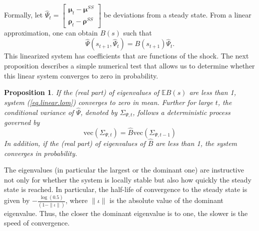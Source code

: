 \documentclass[thmsb,11pt]{article}
\newtheorem{proposition}{Proposition}
\newcommand{\bmat}{\begin{matrix}}
\newcommand{\emat}{\end{matrix}}
\begin{document}
Formally, let $\hat{\Psi}_{t}= \left[\bmat \bm{\mu}_{t} - \bm{\mu}^{SS}\\ \bm \rho_t - \bm \rho^{SS}\emat\right]$ be  deviations from a steady state. From a  linear approximation, one can obtain $B(s)$ such that
\begin{equation}
 \hat{\Psi}(s_{t+1},\hat{\Psi}_t)=B(s_{t+1})\hat{\Psi}_t. \label{eq.linear.lom}
\end{equation}
This linearized system has coefficients that are functions of the shock. The next proposition describes a simple numerical test that allows us to determine whether  this linear system converges to zero in probability.

\begin{proposition}\label{prop: localstability}
If the (real part) of eigenvalues of $\mathbb{E}B(s)$ are less than 1,  system (\ref{eq.linear.lom}) converges to zero  in mean. Further for large $t$, the conditional variance of $\hat{\Psi}$, denoted by $\Sigma_{\Psi,t}$, follows a deterministic process governed by
\[\text{vec}(\Sigma_{\Psi,t})=\hat{B} \text{vec}(\Sigma_{\Psi,t-1})\]	
In addition,  if the (real part) of eigenvalues of $\hat{B}$ are less than 1, the system converges in probability.
\end{proposition}

The eigenvalues (in particular the largest or the dominant one) are instructive not only for whether the system is locally stable but also how quickly the steady state is reached. In particular, the half-life of convergence to the steady state is given by $-\frac{\log(0.5)}{(1-\|\iota\|)}$, where $\|\iota\|$ is the absolute value of the dominant eigenvalue.  Thus, the closer the dominant eigenvalue is to one, the slower is the speed of convergence.
\end{document}
